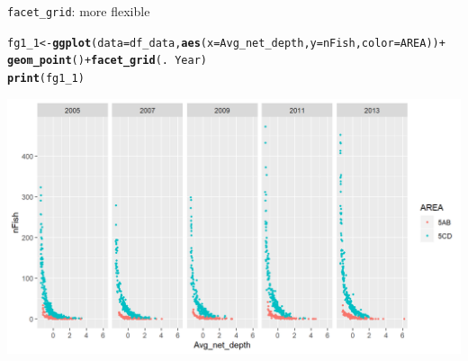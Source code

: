 \documentclass{beamer}\usepackage[]{graphicx}\usepackage[]{color}
\makeatletter
\newcommand{\hlopt}[1]{\textcolor[rgb]{0,0,0}{#1}}%
\newcommand{\hlstd}[1]{\textcolor[rgb]{0.345,0.345,0.345}{#1}}%
\newcommand{\hlkwb}[1]{\textcolor[rgb]{0.69,0.353,0.396}{#1}}%
\newcommand{\hlkwc}[1]{\textcolor[rgb]{0.333,0.667,0.333}{#1}}%
\newcommand{\hlkwd}[1]{\textcolor[rgb]{0.737,0.353,0.396}{\textbf{#1}}}%
\newenvironment{kframe}{%
 \def\at@end@of@kframe{}%
 \ifinner\ifhmode%
  \def\at@end@of@kframe{\end{minipage}}%
  \begin{minipage}{\columnwidth}%
 \fi\fi%
 \def\FrameCommand##1{\hskip\@totalleftmargin \hskip-\fboxsep
 \colorbox{shadecolor}{##1}\hskip-\fboxsep
     \hskip-\linewidth \hskip-\@totalleftmargin \hskip\columnwidth}%
 \MakeFramed {\advance\hsize-\width
   \@totalleftmargin\z@ \linewidth\hsize
   \@setminipage}}%
 {\par\unskip\endMakeFramed%
 \at@end@of@kframe}
\newenvironment{knitrout}{}{} %
\makeatother
\begin{document}
\begin{frame}[fragile]{\lstinline{facet_grid}: more flexible}
\begin{knitrout}\footnotesize
{}\color{fgcolor}\begin{kframe}
\begin{alltt}
\hlstd{fg1_1} \hlkwb{<-} \hlkwd{ggplot}\hlstd{(}\hlkwc{data}\hlstd{=df_data,} \hlkwd{aes}\hlstd{(}\hlkwc{x}\hlstd{=Avg_net_depth,} \hlkwc{y}\hlstd{=nFish,} \hlkwc{color}\hlstd{=AREA))} \hlopt{+}
  \hlkwd{geom_point}\hlstd{()} \hlopt{+} \hlkwd{facet_grid}\hlstd{(.} \hlopt{~} \hlstd{Year)}
\hlkwd{print}\hlstd{(fg1_1)}
\end{alltt}
\end{kframe}

{\centering \includegraphics[width=.9\linewidth]{figure/facet_grid_1-1} 

}



\end{knitrout}
\end{frame}
\end{document}
